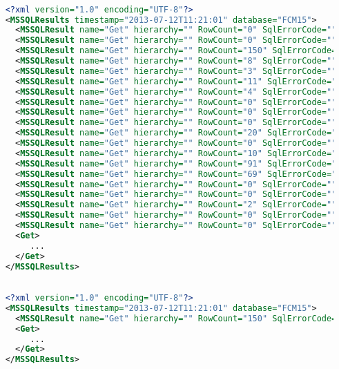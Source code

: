 \begin{lstlisting}[language=XML,label=current_result_set,caption=Выводится сейчас]

	<?xml version="1.0" encoding="UTF-8"?>
	<MSSQLResults timestamp="2013-07-12T11:21:01" database="FCM15">
	  <MSSQLResult name="Get" hierarchy="" RowCount="0" SqlErrorCode="" SqlErrorNumber="" />
	  <MSSQLResult name="Get" hierarchy="" RowCount="0" SqlErrorCode="" SqlErrorNumber="" />
	  <MSSQLResult name="Get" hierarchy="" RowCount="150" SqlErrorCode="" SqlErrorNumber="" />
	  <MSSQLResult name="Get" hierarchy="" RowCount="8" SqlErrorCode="" SqlErrorNumber="" />
	  <MSSQLResult name="Get" hierarchy="" RowCount="3" SqlErrorCode="" SqlErrorNumber="" />
	  <MSSQLResult name="Get" hierarchy="" RowCount="11" SqlErrorCode="" SqlErrorNumber="" />
	  <MSSQLResult name="Get" hierarchy="" RowCount="4" SqlErrorCode="" SqlErrorNumber="" />
	  <MSSQLResult name="Get" hierarchy="" RowCount="0" SqlErrorCode="" SqlErrorNumber="" />
	  <MSSQLResult name="Get" hierarchy="" RowCount="0" SqlErrorCode="" SqlErrorNumber="" />
	  <MSSQLResult name="Get" hierarchy="" RowCount="0" SqlErrorCode="" SqlErrorNumber="" />
	  <MSSQLResult name="Get" hierarchy="" RowCount="20" SqlErrorCode="" SqlErrorNumber="" />
	  <MSSQLResult name="Get" hierarchy="" RowCount="0" SqlErrorCode="" SqlErrorNumber="" />
	  <MSSQLResult name="Get" hierarchy="" RowCount="10" SqlErrorCode="" SqlErrorNumber="" />
	  <MSSQLResult name="Get" hierarchy="" RowCount="91" SqlErrorCode="" SqlErrorNumber="" />
	  <MSSQLResult name="Get" hierarchy="" RowCount="69" SqlErrorCode="" SqlErrorNumber="" />
	  <MSSQLResult name="Get" hierarchy="" RowCount="0" SqlErrorCode="" SqlErrorNumber="" />
	  <MSSQLResult name="Get" hierarchy="" RowCount="0" SqlErrorCode="" SqlErrorNumber="" />
	  <MSSQLResult name="Get" hierarchy="" RowCount="2" SqlErrorCode="" SqlErrorNumber="" />
	  <MSSQLResult name="Get" hierarchy="" RowCount="0" SqlErrorCode="" SqlErrorNumber="" />
	  <MSSQLResult name="Get" hierarchy="" RowCount="0" SqlErrorCode="" SqlErrorNumber="" />
	  <Get>
	     ...
	  </Get>
	</MSSQLResults>

\end{lstlisting}

\begin{lstlisting}[language=XML,label=new_result_set,caption=Нужно выводить]

	<?xml version="1.0" encoding="UTF-8"?>
	<MSSQLResults timestamp="2013-07-12T11:21:01" database="FCM15">
	  <MSSQLResult name="Get" hierarchy="" RowCount="150" SqlErrorCode="" SqlErrorNumber="" />
	  <Get>
	     ...
	  </Get>
	</MSSQLResults>

\end{lstlisting}

